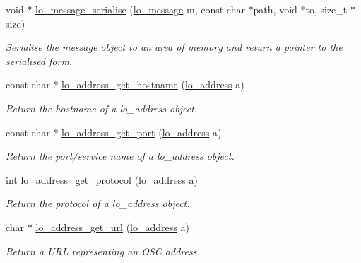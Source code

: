 \begin{CompactItemize}
void $\ast$ \hyperlink{group__liblolowlevel_g5a14045edea33d63792e9a4c82e13b02}{lo\_\-message\_\-serialise} (\hyperlink{lo__types_8h_d126083c98d941f00eb72d1690b38d63}{lo\_\-message} m, const char $\ast$path, void $\ast$to, size\_\-t $\ast$size)
\begin{CompactList}\small\item\em Serialise the message object to an area of memory and return a pointer to the serialised form. \item\end{CompactList}\item 
const char $\ast$ \hyperlink{group__liblolowlevel_g7dbaa4a6dfc9d7369cfbca195809be3c}{lo\_\-address\_\-get\_\-hostname} (\hyperlink{lo__types_8h_bf9b53223467de596b89e1377b0f3f3d}{lo\_\-address} a)
\begin{CompactList}\small\item\em Return the hostname of a lo\_\-address object. \item\end{CompactList}\item 
const char $\ast$ \hyperlink{group__liblolowlevel_g75bc15ab78de049c0e0d7e24a0d6d0c1}{lo\_\-address\_\-get\_\-port} (\hyperlink{lo__types_8h_bf9b53223467de596b89e1377b0f3f3d}{lo\_\-address} a)
\begin{CompactList}\small\item\em Return the port/service name of a lo\_\-address object. \item\end{CompactList}\item 
int \hyperlink{group__liblolowlevel_gaae09ebb4cf42e92504fe9aa7e7b2184}{lo\_\-address\_\-get\_\-protocol} (\hyperlink{lo__types_8h_bf9b53223467de596b89e1377b0f3f3d}{lo\_\-address} a)
\begin{CompactList}\small\item\em Return the protocol of a lo\_\-address object. \item\end{CompactList}\item 
char $\ast$ \hyperlink{group__liblolowlevel_g85d7101e9e3a3339544445b539e3a5d2}{lo\_\-address\_\-get\_\-url} (\hyperlink{lo__types_8h_bf9b53223467de596b89e1377b0f3f3d}{lo\_\-address} a)
\begin{CompactList}\small\item\em Return a URL representing an OSC address. \item\end{CompactList}\item 

\end{CompactItemize}

